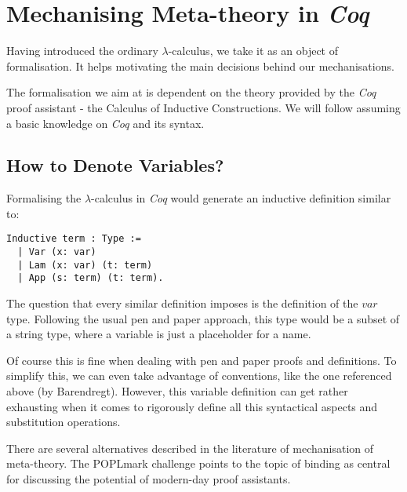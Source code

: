 
\section{Mechanising Meta-theory in \textit{Coq}}

Having introduced the ordinary $\lambda$-calculus, we take it as an object of formalisation.
It helps motivating the main decisions behind our mechanisations.

The formalisation we aim at is dependent on the theory provided by the \textit{Coq} proof assistant - the Calculus of Inductive Constructions.
We will follow assuming a basic knowledge on \textit{Coq} and its syntax. %

\subsection{How to Denote Variables?}

Formalising the $\lambda$-calculus in \textit{Coq} would generate an inductive definition similar to:

\begin{lstlisting}[language=Coq]
  Inductive term : Type :=
  | Var (x: var)
  | Lam (x: var) (t: term)
  | App (s: term) (t: term).
\end{lstlisting}

The question that every similar definition imposes is the definition of the $var$ type. Following the usual pen and paper approach, this type would be a subset of a string type, where a variable is just a placeholder for a name.

Of course this is fine when dealing with pen and paper proofs and definitions. To simplify this, we can even take advantage of conventions, like the one referenced above (by Barendregt). 
However, this variable definition can get rather exhausting  when it comes to rigorously define all this syntactical aspects and substitution operations.

There are several alternatives described in the literature of mechanisation of meta-theory. 
The POPLmark challenge \cite{POPLmark} points to the topic of binding as central for discussing the potential of modern-day proof assistants.

